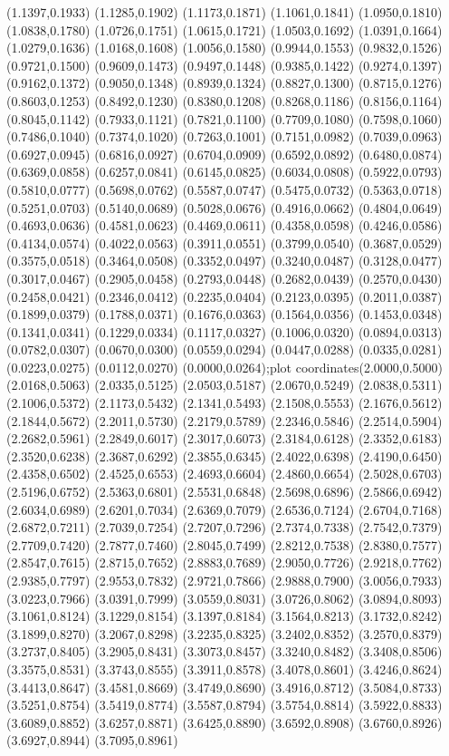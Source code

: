 {(1.1397,0.1933) (1.1285,0.1902) (1.1173,0.1871) (1.1061,0.1841) (1.0950,0.1810) (1.0838,0.1780) (1.0726,0.1751) (1.0615,0.1721) (1.0503,0.1692) (1.0391,0.1664) (1.0279,0.1636) (1.0168,0.1608) (1.0056,0.1580) (0.9944,0.1553) (0.9832,0.1526) (0.9721,0.1500) (0.9609,0.1473) (0.9497,0.1448) (0.9385,0.1422) (0.9274,0.1397) (0.9162,0.1372) (0.9050,0.1348) (0.8939,0.1324) (0.8827,0.1300) (0.8715,0.1276) (0.8603,0.1253) (0.8492,0.1230) (0.8380,0.1208) (0.8268,0.1186) (0.8156,0.1164) (0.8045,0.1142) (0.7933,0.1121) (0.7821,0.1100) (0.7709,0.1080) (0.7598,0.1060) (0.7486,0.1040) (0.7374,0.1020) (0.7263,0.1001) (0.7151,0.0982) (0.7039,0.0963) (0.6927,0.0945) (0.6816,0.0927) (0.6704,0.0909) (0.6592,0.0892) (0.6480,0.0874) (0.6369,0.0858) (0.6257,0.0841) (0.6145,0.0825) (0.6034,0.0808) (0.5922,0.0793) (0.5810,0.0777) (0.5698,0.0762) (0.5587,0.0747) (0.5475,0.0732) (0.5363,0.0718) (0.5251,0.0703) (0.5140,0.0689) (0.5028,0.0676) (0.4916,0.0662) (0.4804,0.0649) (0.4693,0.0636) (0.4581,0.0623) (0.4469,0.0611) (0.4358,0.0598) (0.4246,0.0586) (0.4134,0.0574) (0.4022,0.0563) (0.3911,0.0551) (0.3799,0.0540) (0.3687,0.0529) (0.3575,0.0518) (0.3464,0.0508) (0.3352,0.0497) (0.3240,0.0487) (0.3128,0.0477) (0.3017,0.0467) (0.2905,0.0458) (0.2793,0.0448) (0.2682,0.0439) (0.2570,0.0430) (0.2458,0.0421) (0.2346,0.0412) (0.2235,0.0404) (0.2123,0.0395) (0.2011,0.0387) (0.1899,0.0379) (0.1788,0.0371) (0.1676,0.0363) (0.1564,0.0356) (0.1453,0.0348) (0.1341,0.0341) (0.1229,0.0334) (0.1117,0.0327) (0.1006,0.0320) (0.0894,0.0313) (0.0782,0.0307) (0.0670,0.0300) (0.0559,0.0294) (0.0447,0.0288) (0.0335,0.0281) (0.0223,0.0275) (0.0112,0.0270) (0.0000,0.0264)};plot coordinates{(2.0000,0.5000) (2.0168,0.5063) (2.0335,0.5125) (2.0503,0.5187) (2.0670,0.5249) (2.0838,0.5311) (2.1006,0.5372) (2.1173,0.5432) (2.1341,0.5493) (2.1508,0.5553) (2.1676,0.5612) (2.1844,0.5672) (2.2011,0.5730) (2.2179,0.5789) (2.2346,0.5846) (2.2514,0.5904) (2.2682,0.5961) (2.2849,0.6017) (2.3017,0.6073) (2.3184,0.6128) (2.3352,0.6183) (2.3520,0.6238) (2.3687,0.6292) (2.3855,0.6345) (2.4022,0.6398) (2.4190,0.6450) (2.4358,0.6502) (2.4525,0.6553) (2.4693,0.6604) (2.4860,0.6654) (2.5028,0.6703) (2.5196,0.6752) (2.5363,0.6801) (2.5531,0.6848) (2.5698,0.6896) (2.5866,0.6942) (2.6034,0.6989) (2.6201,0.7034) (2.6369,0.7079) (2.6536,0.7124) (2.6704,0.7168) (2.6872,0.7211) (2.7039,0.7254) (2.7207,0.7296) (2.7374,0.7338) (2.7542,0.7379) (2.7709,0.7420) (2.7877,0.7460) (2.8045,0.7499) (2.8212,0.7538) (2.8380,0.7577) (2.8547,0.7615) (2.8715,0.7652) (2.8883,0.7689) (2.9050,0.7726) (2.9218,0.7762) (2.9385,0.7797) (2.9553,0.7832) (2.9721,0.7866) (2.9888,0.7900) (3.0056,0.7933) (3.0223,0.7966) (3.0391,0.7999) (3.0559,0.8031) (3.0726,0.8062) (3.0894,0.8093) (3.1061,0.8124) (3.1229,0.8154) (3.1397,0.8184) (3.1564,0.8213) (3.1732,0.8242) (3.1899,0.8270) (3.2067,0.8298) (3.2235,0.8325) (3.2402,0.8352) (3.2570,0.8379) (3.2737,0.8405) (3.2905,0.8431) (3.3073,0.8457) (3.3240,0.8482) (3.3408,0.8506) (3.3575,0.8531) (3.3743,0.8555) (3.3911,0.8578) (3.4078,0.8601) (3.4246,0.8624) (3.4413,0.8647) (3.4581,0.8669) (3.4749,0.8690) (3.4916,0.8712) (3.5084,0.8733) (3.5251,0.8754) (3.5419,0.8774) (3.5587,0.8794) (3.5754,0.8814) (3.5922,0.8833) (3.6089,0.8852) (3.6257,0.8871) (3.6425,0.8890) (3.6592,0.8908) (3.6760,0.8926) (3.6927,0.8944) (3.7095,0.8961) }
